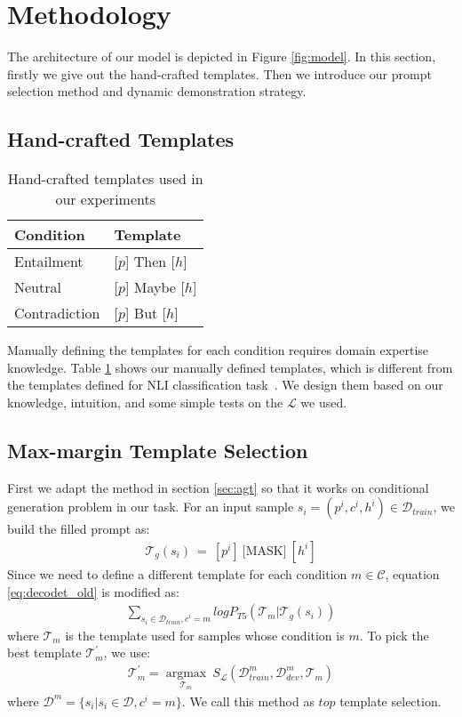 \section{Methodology}

The architecture of our model is depicted in Figure \ref{fig:model}. In this section, firstly we give out the hand-crafted templates. Then we introduce our prompt selection method and dynamic demonstration strategy. 

\subsection{Hand-crafted Templates}

\begin{table}[!h]
	\centering
	\small
	\begin{tabular}{l|l}
		\toprule
		\textbf{Condition} & \textbf{Template}\\
		\midrule
		Entailment  & [$p$] Then [$h$]  \\
		Neutral   & [$p$] Maybe [$h$]  \\
		Contradiction   & [$p$] But [$h$]  \\
		\bottomrule
	\end{tabular}
	\caption{Hand-crafted templates used in our experiments}
	\label{table:manua}
\end{table}
Manually defining the templates for each condition requires domain expertise knowledge. Table \ref{table:manua} shows our manually defined templates, which is different from the templates defined for NLI classification task~\citep{DBLP:conf/eacl/SchickS21}. We design them based on our knowledge, intuition, and some simple tests on the $\mathcal{L}$ we used.

\subsection{Max-margin Template Selection}

First we adapt the method in section \ref{sec:agt} so that it works on conditional generation problem in our task. For an input sample $s_i = (p^i, c^i, h^i) \in \mathcal{D}_{train}$, we build the filled prompt as:
\begin{align*}
	\mathcal{T}_g (s_i)\ =\ [p^i]\ \mbox{[MASK]}\ [h^i]
\end{align*}\label{eq:t5}
Since we need to define a different template for each condition $m \in \mathcal{C}$, equation \ref{eq:decodet_old} is modified as:
\begin{align}
	\sum_{s_i\in\mathcal{D}_{train}, c^i=m}log P_{T5}(\mathcal{T}_m | \mathcal{T}_g (s_i))
	\label{eq:decodet}
\end{align}
where $\mathcal{T}_m$ is the template used for samples whose condition is $m$. To pick the best template $\mathcal{T}_m^{'}$, we use:
\begin{align}
	\mathcal{T}_m^{'}=\mathop{\arg\max}\limits_{\mathcal{T}_m}\ S_{\mathcal{L}}(\mathcal{D}_{train}^m, \mathcal{D}_{dev}^m, \mathcal{T}_m)
	\label{eq:best}
\end{align}
where $\mathcal{D}^m=\{s_i|s_i\in\mathcal{D}, c^i=m\}$. We call this method as $top$ template selection.
 
